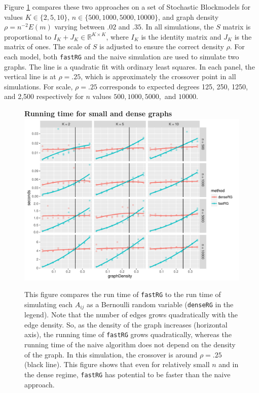 \documentclass[twoside,11pt]{article}
\begin{document}
Figure \ref{fig:dense} compares these two approaches on a set of Stochastic Blockmodels for values $K \in \{2, 5, 10\}$, $n \in \{500,1000,5000,10000\}$, and graph density $\rho = n^{-2} E(m)$ varying between $.02$ and $.35$.  In all simulations, the $S$ matrix is proportional to $I_K + J_K \in \mathds{R}^{K\times K}$, where $I_K$ is the identity matrix and $J_K$ is the matrix of ones.  The scale of $S$ is adjusted to ensure the correct density $\rho$.  For each model, both \texttt{fastRG} and the naive simulation are used to simulate two graphs.  The line is a quadratic fit with ordinary least squares. 
In each panel, the vertical line is at $\rho = .25$, which is approximately the crossover point in all simulations.  For scale, $\rho = .25$ corresponds to expected degrees 125, 250, 1250, and 2,500 respectively for $n$ values $500,1000,5000,$ and $10000$.  


\begin{figure}[p] %
   \centering
   \textbf{Running time for small and dense graphs}
   \includegraphics[width=6in]{denseRG.pdf} 
   \caption{This figure compares the run time of \texttt{fastRG} to the run time of simulating each $A_{ij}$  as a Bernoulli random variable (\texttt{denseRG} in the legend).  Note that the number of edges grows quadratically with the edge density.  So, as the density of the graph increases (horizontal axis), the running time of \texttt{fastRG} grows quadratically, whereas the running time of the naive algorithm does not depend on the density of the graph.  In this simulation, the crossover is around $\rho = .25$ (black line).  This figure shows that even for relatively small $n$ and in the dense regime,  \texttt{fastRG} has potential to be faster than the naive approach. }
   \label{fig:dense}
\end{figure}
\end{document}
